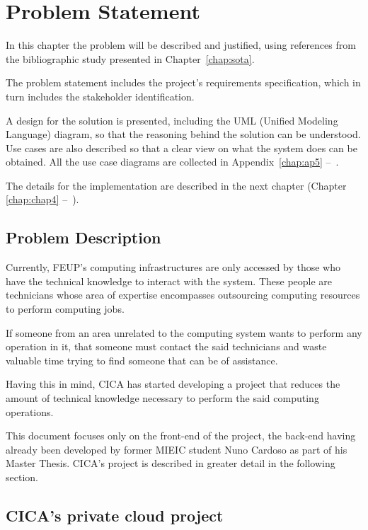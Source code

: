 \chapter{Problem Statement} \label{chap:chap3}

In this chapter the problem will be described and justified, using references from the bibliographic study presented in Chapter~\ref{chap:sota}.

The problem statement includes the project's requirements specification, which in turn includes the stakeholder identification. 

A design for the solution is presented, including the UML (Unified Modeling Language) diagram, so that the reasoning behind the solution can be understood. Use cases are also described so that a clear view on what the system does can be obtained. All the use case diagrams are collected in Appendix~\ref{chap:ap5} --~.

The details for the implementation are described in the next chapter (Chapter \ref{chap:chap4} --~).

\section{Problem Description}

Currently, FEUP's computing infrastructures are only accessed by those who have the technical knowledge to interact with the system. These people are technicians whose area of expertise encompasses outsourcing computing resources to perform computing jobs. 

If someone from an area unrelated to the computing system wants to perform any operation in it, that someone must contact the said technicians and waste valuable time trying to find someone that can be of assistance.

Having this in mind, CICA has started developing a project that reduces the amount of technical knowledge necessary to perform the said computing operations.

This document focuses only on the front-end of the project, the back-end having already been developed by former MIEIC student Nuno Cardoso as part of his Master Thesis. CICA's project is described in greater detail in the following section.

\section{CICA's private cloud project} \label{sec:project}

